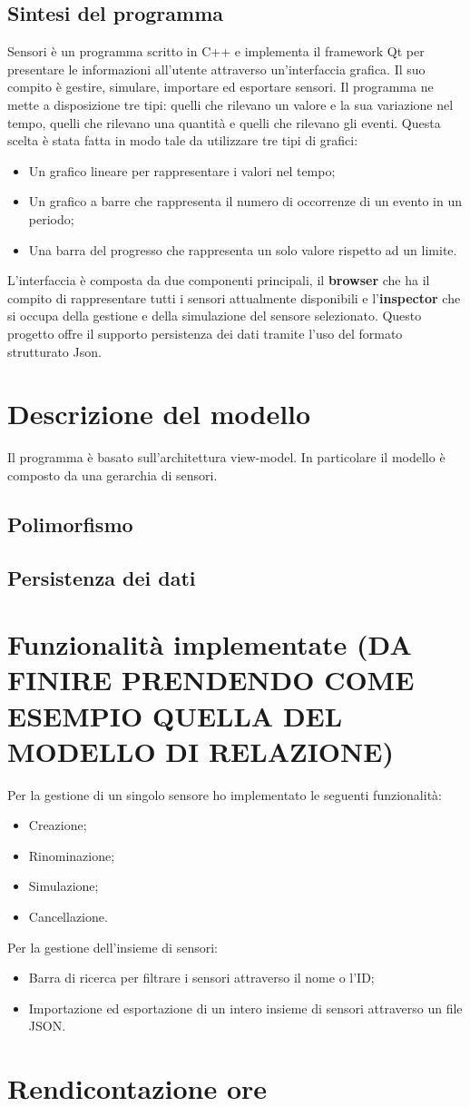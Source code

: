 \documentclass[a4paper]{article}
\begin{document}
\subsection{Sintesi del programma}
Sensori è un programma scritto in C++ e implementa il framework Qt per presentare le informazioni all'utente attraverso un'interfaccia grafica.
Il suo compito è gestire, simulare, importare ed esportare sensori.
Il programma ne mette a disposizione tre tipi: quelli che rilevano un valore e la sua variazione nel tempo, quelli che rilevano una quantità e 
quelli che rilevano gli eventi.
Questa scelta è stata fatta in modo tale da utilizzare tre tipi di grafici:
\begin{itemize}
    \item Un grafico lineare per rappresentare i valori nel tempo;
    \item Un grafico a barre che rappresenta il numero di occorrenze di un evento in un periodo;
    \item Una barra del progresso che rappresenta un solo valore rispetto ad un limite.
\end{itemize}
L'interfaccia è composta da due componenti principali, il \textbf{browser} che ha il compito di rappresentare tutti i sensori attualmente 
disponibili e l'\textbf{inspector} che si occupa della gestione e della simulazione del sensore selezionato.
Questo progetto offre il supporto persistenza dei dati tramite l'uso del formato strutturato Json.
\section{Descrizione del modello}
Il programma è basato sull'architettura view-model. In particolare il modello è composto da una gerarchia di sensori. 

\subsection{Polimorfismo}
\subsection{Persistenza dei dati}
\section{Funzionalità implementate (DA FINIRE PRENDENDO COME ESEMPIO QUELLA DEL MODELLO DI RELAZIONE)}
Per la gestione di un singolo sensore ho implementato le seguenti funzionalità:
\begin{itemize}
    \item Creazione;
    \item Rinominazione;
    \item Simulazione;
    \item Cancellazione.
\end{itemize}
Per la gestione dell'insieme di sensori:
\begin{itemize}
    \item Barra di ricerca per filtrare i sensori attraverso il nome o l'ID;
    \item Importazione ed esportazione di un intero insieme di sensori attraverso un file JSON.
\end{itemize}
\section{Rendicontazione ore}
\end{document}

